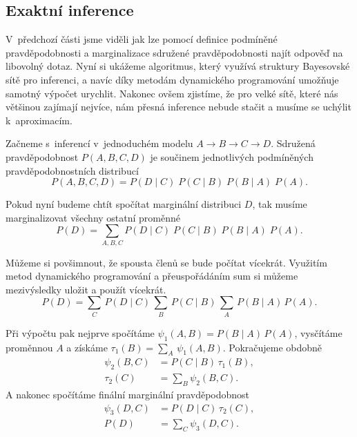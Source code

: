 \subsection{Exaktní inference}

V~předchozí části jsme viděli jak lze pomocí definice podmíněné pravděpodobnosti a marginalizace sdružené pravděpodobnosti najít odpověď na libovolný dotaz. 
Nyní si ukážeme algoritmus, který využívá struktury Bayesovské sítě pro inferenci, a navíc díky metodám dynamického programování umožňuje samotný výpočet urychlit.
Nakonec ovšem zjistíme, že pro velké sítě, které nás většinou zajímají nejvíce, nám přesná inference nebude stačit a musíme se uchýlit k~aproximacím.

Začneme s~inferencí v~jednoduchém modelu $A \rightarrow B \rightarrow C \rightarrow D$.
Sdružená pravděpodobnost $P(A, B, C, D)$ je součinem jednotlivých podmíněných pravděpodobnostních distribucí
\begin{equation}
P(A, B, C, D) = P(D \mid C)\; P(C \mid B) \;P(B \mid A) \;P(A).
\end{equation}

Pokud nyní budeme chtít spočítat marginální distribuci $D$, tak musíme marginalizovat všechny ostatní proměnné
\begin{equation}
P(D) = \sum_{A, B, C} P(D \mid C) \; P(C \mid B) \; P(B \mid A) \;P(A).
\end{equation}

Můžeme si povšimnout, že spousta členů se bude počítat vícekrát.
Využitím metod dynamického programování a přeuspořádáním sum si můžeme mezivýsledky uložit a použít vícekrát.
\begin{equation}
P(D) = \sum_C \, P(D \mid C) \,\sum_B \,P(C \mid B) \,\sum_A \,P(B \mid A) \,P(A).
\end{equation}

Při výpočtu pak nejprve spočítáme $\psi_1(A, B) =  P(B \mid A) \, P(A)$,  vysčítáme proměnnou $A$ a získáme $\tau_1(B) = \sum_A \,\psi_1(A, B)$.
Pokračujeme obdobně
\begin{align}
    \psi_2(B, C) &= P(C \mid B) \,\tau_1(B), \\
    \tau_2(C) &= \sum_B \psi_2(B, C).
\end{align}
A nakonec spočítáme finální marginální pravděpodobnost
\begin{align}
    \psi_3(D, C) &= P(D \mid C) \, \tau_2(C), \\
    P(D) &= \sum_C \psi_3(D, C).
\end{align}

